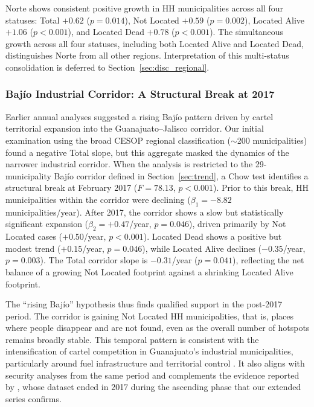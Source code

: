 Norte shows consistent positive growth in HH municipalities across all four statuses: Total $+0.62$ ($p = 0.014$), Not Located $+0.59$ ($p = 0.002$), Located Alive $+1.06$ ($p < 0.001$), and Located Dead $+0.78$ ($p < 0.001$).
The simultaneous growth across all four statuses, including both Located Alive and Located Dead, distinguishes Norte from all other regions.
Interpretation of this multi-status consolidation is deferred to Section~\ref{sec:disc_regional}.

\subsubsection{Baj\'{i}o Industrial Corridor: A Structural Break at 2017}

Earlier annual analyses \citep{cadena_garrocho_2019} suggested a rising Baj\'{i}o pattern driven by cartel territorial expansion into the Guanajuato--Jalisco corridor.
Our initial examination using the broad CESOP regional classification ($\sim$200 municipalities) found a negative Total slope, but this aggregate masked the dynamics of the narrower industrial corridor.
When the analysis is restricted to the 29-municipality Baj\'{i}o corridor defined in Section~\ref{sec:trend}, a Chow test identifies a structural break at February 2017 ($F = 78.13$, $p < 0.001$).
Prior to this break, HH municipalities within the corridor were declining ($\beta_1 = -8.82$ municipalities/year).
After 2017, the corridor shows a slow but statistically significant expansion ($\beta_2 = +0.47$/year, $p = 0.046$), driven primarily by Not Located cases ($+0.50$/year, $p < 0.001$).
Located Dead shows a positive but modest trend ($+0.15$/year, $p = 0.046$), while Located Alive declines ($-0.35$/year, $p = 0.003$).
The Total corridor slope is $-0.31$/year ($p = 0.041$), reflecting the net balance of a growing Not Located footprint against a shrinking Located Alive footprint.

The ``rising Baj\'{i}o'' hypothesis thus finds qualified support in the post-2017 period. 
The corridor is gaining Not Located HH municipalities, that is, places where people 
disappear and are not found, even as the overall number of hotspots remains broadly stable.
This temporal pattern is consistent with the intensification of cartel competition in 
Guanajuato's industrial municipalities, particularly around fuel infrastructure and 
territorial control \citep{reyes_robo_2022}. It also aligns with security analyses from 
the same period and complements the evidence reported by \citet{cadena_garrocho_2019}, 
whose dataset ended in 2017 during the ascending phase that our extended series confirms.

